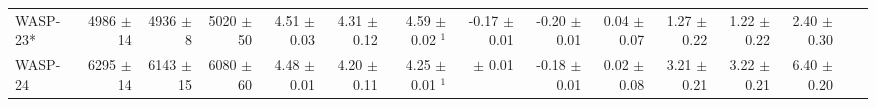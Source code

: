 \begin{sidewaystable*}[t!]
{\begin{tabular}{l r r r r r r r r r r r r r r}
 
WASP-23*  
 &  4986  $\pm$ 14
 &  4936  $\pm$ 8 
 &   5020 $\pm$ 50
 &   4.51  $\pm$ 0.03  
 & 4.31  $\pm$ 0.12
 &  4.59  $\pm$ 0.02 $^1$
 &  -0.17  $\pm$ 0.01 
 & -0.20  $\pm$ 0.01 
 &  0.04   $\pm$ 0.07 
 &  1.27  $\pm$ 0.22 
 & 1.22  $\pm$ 0.22 
 &  2.40   $\pm$ 0.30  \\



  
  WASP-24  
  &  6295  $\pm$ 14 
& 6143  $\pm$ 15 
&  6080 $\pm$ 60 
&   4.48  $\pm$ 0.01 
 &  4.20  $\pm$ 0.11 
 & 4.25  $\pm$ 0.01 $^1$
 &   $\pm$ 0.01
 & -0.18  $\pm$ 0.01 
 &  0.02   $\pm$ 0.08
 &  3.21  $\pm$ 0.21
 & 3.22  $\pm$ 0.21
  &  6.40   $\pm$ 0.20  \\



\end{tabular}}
\end{sidewaystable*}
